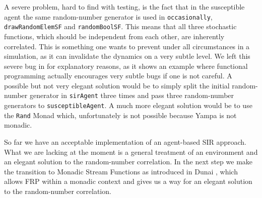 A severe problem, hard to find with testing, is the fact that in the susceptible agent the same random-number generator is used in \texttt{occasionally}, \texttt{drawRandomElemSF} and \texttt{randomBoolSF}. This means that all three stochastic functions, which should be independent from each other, are inherently correlated. This is something one wants to prevent under all circumstances in a simulation, as it can invalidate the dynamics on a very subtle level. We left this severe bug in for explanatory reasons, as it shows an example where functional programming actually encourages very subtle bugs if one is not careful. A possible but not very elegant solution would be to simply split the initial random-number generator in \texttt{sirAgent} three times and pass three random-number generators to \texttt{susceptibleAgent}. A much more elegant solution would be to use the \texttt{Rand} Monad which, unfortunately is not possible because Yampa is not monadic.

So far we have an acceptable implementation of an agent-based SIR approach. What we are lacking at the moment is a general treatment of an environment and an elegant solution to the random-number correlation. In the next step we make the transition to Monadic Stream Functions as introduced in Dunai \cite{perez_functional_2016}, which allows FRP within a monadic context and gives us a way for an elegant solution to the random-number correlation.